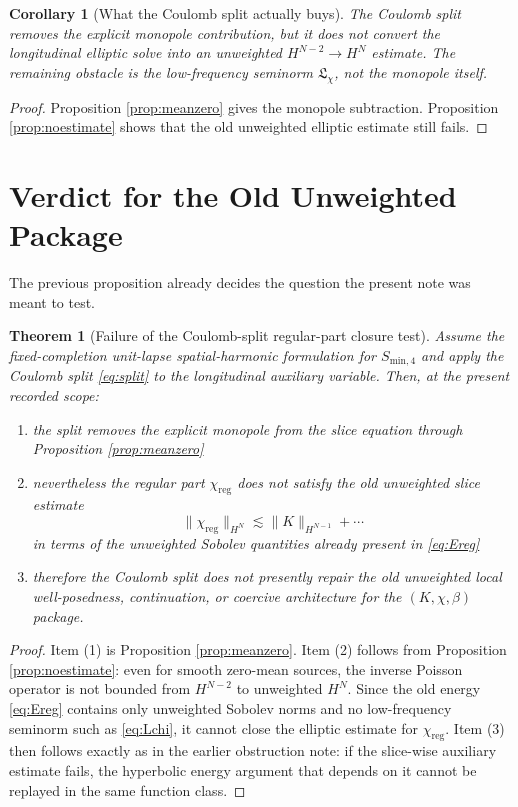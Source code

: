 \documentclass[11pt]{article}
\newtheorem{corollary}{Corollary}
\newtheorem{theorem}{Theorem}
\begin{document}
\begin{corollary}[What the Coulomb split actually buys]
\label{cor:whatbuys}
The Coulomb split removes the explicit monopole contribution, but it does \emph{not} convert the longitudinal elliptic solve into an unweighted \(H^{N-2}\to H^N\) estimate. The remaining obstacle is the low-frequency seminorm \(\mathfrak L_\chi\), not the monopole itself.
\end{corollary}

\begin{proof}
Proposition \ref{prop:meanzero} gives the monopole subtraction. Proposition \ref{prop:noestimate} shows that the old unweighted elliptic estimate still fails.
\end{proof}

\section{Verdict for the Old Unweighted Package}

The previous proposition already decides the question the present note was meant to test.

\begin{theorem}[Failure of the Coulomb-split regular-part closure test]
\label{thm:failure}
Assume the fixed-completion unit-lapse spatial-harmonic formulation for \(S_{\mathrm{min},4}\) and apply the Coulomb split \eqref{eq:split} to the longitudinal auxiliary variable. Then, at the present recorded scope:
\begin{enumerate}
    \item the split removes the explicit monopole from the slice equation through Proposition \ref{prop:meanzero}
    \item nevertheless the regular part \(\chi_{\mathrm{reg}}\) does not satisfy the old unweighted slice estimate
    \[
    \|\chi_{\mathrm{reg}}\|_{H^N}
    \lesssim
    \|K\|_{H^{N-1}}+\cdots
    \]
    in terms of the unweighted Sobolev quantities already present in \eqref{eq:Ereg}
    \item therefore the Coulomb split does not presently repair the old unweighted local well-posedness, continuation, or coercive architecture for the \((K,\chi,\beta)\) package.
\end{enumerate}
\end{theorem}

\begin{proof}
Item (1) is Proposition \ref{prop:meanzero}. Item (2) follows from Proposition \ref{prop:noestimate}: even for smooth zero-mean sources, the inverse Poisson operator is not bounded from \(H^{N-2}\) to unweighted \(H^N\). Since the old energy \eqref{eq:Ereg} contains only unweighted Sobolev norms and no low-frequency seminorm such as \eqref{eq:Lchi}, it cannot close the elliptic estimate for \(\chi_{\mathrm{reg}}\). Item (3) then follows exactly as in the earlier obstruction note: if the slice-wise auxiliary estimate fails, the hyperbolic energy argument that depends on it cannot be replayed in the same function class.
\end{proof}
\end{document}
